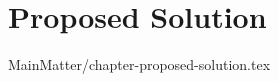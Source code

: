 
%

\chapter{Proposed Solution}
\label{chap:proposed-solution}
MainMatter/chapter-proposed-solution.tex

